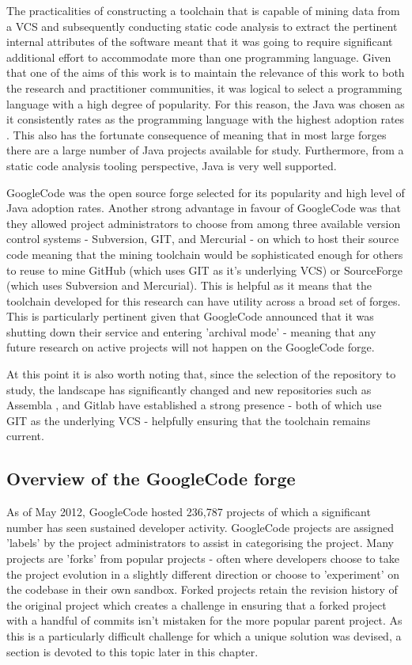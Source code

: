 The practicalities of constructing a toolchain that is capable of mining data from a VCS and subsequently conducting static code analysis to extract the pertinent internal attributes of the software meant that it was going to require significant additional effort to accommodate more than one programming language. Given that one of the aims of this work is to maintain the relevance of this work to both the research and practitioner communities, it was logical to select a programming language with a high degree of popularity. For this reason, the Java was chosen as it consistently rates as the programming language with the highest adoption rates \cite{tiobe2017}. This also has the fortunate consequence of meaning that in most large forges there are a large number of Java projects available for study.  Furthermore, from a static code analysis tooling perspective, Java is very well supported.

GoogleCode was the open source forge selected for its popularity and high level of Java adoption rates. Another strong advantage in favour of GoogleCode was that they allowed project administrators to choose from among three available version control systems - Subversion, GIT, and Mercurial - on which to host their source code meaning that the mining toolchain would be sophisticated enough for others to reuse to mine GitHub (which uses GIT as it's underlying VCS) or SourceForge (which uses Subversion and Mercurial). This is helpful as it means that the toolchain developed for this research can have utility across a broad set of forges. This is particularly pertinent given that GoogleCode announced that it was shutting down their service and entering 'archival mode' - meaning that any future research on active projects will not happen on the GoogleCode forge. 

At this point it is also worth noting that, since the selection of the repository to study, the landscape has significantly changed and new repositories such as Assembla \cite{assembla}, and Gitlab \cite{gitlab} have established a strong presence - both of which use GIT as the underlying VCS - helpfully ensuring that the toolchain remains current.

\subsection{Overview of the GoogleCode forge}
As of May 2012, GoogleCode hosted 236,787 projects of which a significant number has seen sustained developer activity. GoogleCode projects are assigned 'labels' by the project administrators to assist in categorising the project. Many projects are 'forks' from popular projects - often where developers choose to take the project evolution in a slightly different direction or choose to 'experiment' on the codebase in their own sandbox. Forked projects retain the revision history of the original project which creates a challenge in ensuring that a forked project with a handful of commits isn't mistaken for the more popular parent project. As this is a particularly difficult challenge for which a unique solution was devised, a section is devoted to this topic later in this chapter.


